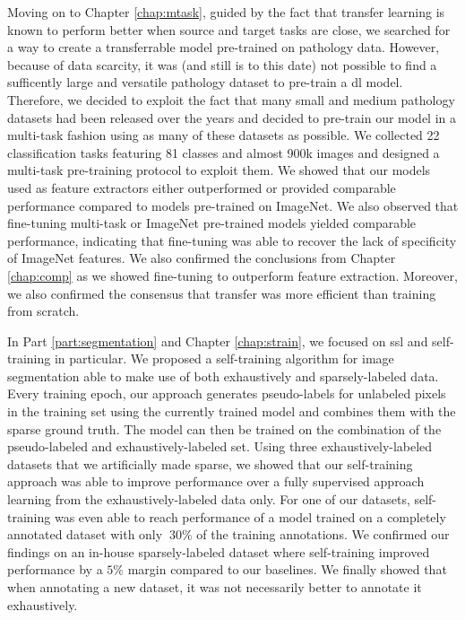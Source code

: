 Moving on to Chapter \ref{chap:mtask}, guided by the fact that transfer learning is known to perform better when source and target tasks are close, we searched for a way to create a transferrable model pre-trained on pathology data. However, because of data scarcity, it was (and still is to this date) not possible to find a sufficently large and versatile pathology dataset to pre-train a \acrlong{dl} model. Therefore, we decided to exploit the fact that many small and medium pathology datasets had been released over the years and decided to pre-train our model in a multi-task fashion using as many of these datasets as possible. We collected 22 classification tasks featuring 81 classes and almost 900k images and designed a multi-task pre-training protocol to exploit them. We showed that our models used as feature extractors either outperformed or provided comparable performance compared to models pre-trained on ImageNet. We also observed that fine-tuning multi-task or ImageNet pre-trained models yielded comparable performance, indicating that fine-tuning was able to recover the lack of specificity of ImageNet features. We also confirmed the conclusions from Chapter \ref{chap:comp} as we showed fine-tuning to outperform feature extraction. Moreover, we also confirmed the consensus that transfer was more efficient than training from scratch.

In Part \ref{part:segmentation} and Chapter \ref{chap:strain}, we focused on \acrlong{ssl} and self-training in particular. We proposed a self-training algorithm for image segmentation able to make use of both exhaustively and sparsely-labeled data. Every training epoch, our approach generates pseudo-labels for unlabeled pixels in the training set using the currently trained model and combines them with the sparse ground truth. The model can then be trained on the combination of the pseudo-labeled and exhaustively-labeled set. Using three exhaustively-labeled datasets that we artificially made sparse, we showed that our self-training approach was able to improve performance over a fully supervised approach learning from the exhaustively-labeled data only. For one of our datasets, self-training was even able to reach performance of a model trained on a completely annotated dataset with only $~30\%$ of the training annotations. We confirmed our findings on an in-house sparsely-labeled dataset where self-training improved performance by a $5\%$ margin compared to our baselines. We finally showed that when annotating a new dataset, it was not necessarily better to annotate it exhaustively. 


